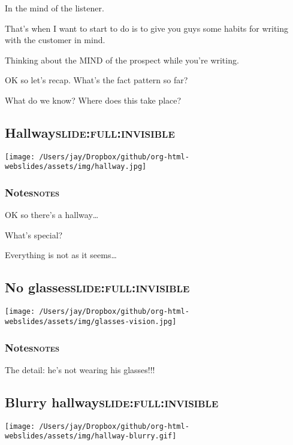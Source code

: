 \documentclass[11pt]{article}
\begin{document}
In the mind of the listener.

That's when I want to start to do is to give you guys some habits for writing with the customer in mind.

Thinking about the MIND of the prospect while you're writing.

OK so let's recap. What's the fact pattern so far?

What do we know? Where does this take place?
\subsection{Hallway\hfill{}\textsc{slide:full:invisible}}
\label{sec:orgbcb40e2}
\begin{center}
\texttt{[image: /Users/jay/Dropbox/github/org-html-webslides/assets/img/hallway.jpg]}
\end{center}

\subsubsection{Notes\hfill{}\textsc{notes}}
\label{sec:orgef547be}
OK so there's a hallway\ldots{}

What's special?

Everything is not as it seems\ldots{}

\subsection{No glasses\hfill{}\textsc{slide:full:invisible}}
\label{sec:orgcec2f4f}
\begin{center}
\texttt{[image: /Users/jay/Dropbox/github/org-html-webslides/assets/img/glasses-vision.jpg]}
\end{center}

\subsubsection{Notes\hfill{}\textsc{notes}}
\label{sec:org7606975}
The detail: he's not wearing his glasses!!!

\subsection{Blurry hallway\hfill{}\textsc{slide:full:invisible}}
\label{sec:org1f53548}
\begin{center}
\texttt{[image: /Users/jay/Dropbox/github/org-html-webslides/assets/img/hallway-blurry.gif]}
\end{center}
\end{document}

